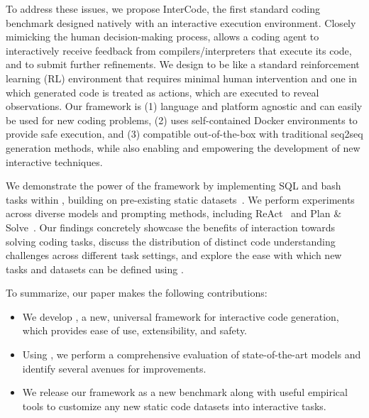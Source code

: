 To address these issues, we propose InterCode, the first standard coding benchmark designed natively with an interactive execution environment. Closely mimicking the human decision-making process, \benchmark{} allows a coding agent to interactively receive feedback from compilers/interpreters that execute its code, and to submit further refinements. We design \benchmark{} to be like a standard reinforcement learning (RL) environment that requires minimal human intervention and one in which generated code is treated as actions, which are executed to reveal observations. Our framework is (1) language and platform agnostic and can easily be used for new coding problems, (2) uses self-contained Docker environments to provide safe execution, and (3) compatible out-of-the-box with traditional seq2seq generation methods, while also enabling and empowering the development of new interactive techniques. 

We demonstrate the power of the framework by implementing SQL and bash tasks within \benchmark{}, building on pre-existing static datasets~\cite{zhong2017seq2sql, lin-etal-2018-nl2bash}. We perform experiments across diverse models and prompting methods, including ReAct~\cite{yao2023react} and Plan \& Solve~\cite{wang2023planandsolve}. Our findings concretely showcase the benefits of interaction towards solving coding tasks, discuss the distribution of distinct code understanding challenges across different task settings, and explore the ease with which new tasks and datasets can be defined using \benchmark{}.

To summarize, our paper makes the following contributions:
\begin{itemize}%
\item We develop \benchmark{}, a new, universal framework for interactive code generation, which provides ease of use, extensibility, and safety.
\item Using \benchmark{}, we perform a comprehensive evaluation of state-of-the-art models and identify several avenues for improvements.
\item We release our framework as a new benchmark along with useful empirical tools to customize any new static code datasets into interactive tasks.
\end{itemize}












